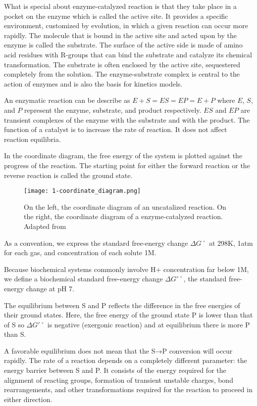 What is special about enzyme-catalyzed reaction is that they take place in a pocket on the enzyme
which is called the active site. It provides a specific environment, customized by evolution, in which
a given reaction can occur more rapidly. 
The molecule that is bound in the active site and acted upon by the enzyme is called the substrate.
The surface of the active side is made of amino acid residues with R-groups that can bind the 
substrate and catalyze its chemical transformation. The substrate is often enclosed by the active site, 
sequestered completely from the solution.
The enzyme-substrate complex is central to the action of enzymes and is also the basis for kinetics models.

An enzymatic reaction can be describe as $E+S=ES=EP=E+P$ where $E$, $S$, and $P$ represent the enzyme,
substrate, and product respectively. $ES$ and $EP$ are transient complexes of the enzyme with the substrate
and with the product. The function of a catalyst is to increase the rate of reaction. It does not affect
reaction equilibria. 

In the coordinate diagram, the free energy of the system is plotted against the progress of the reaction. 
The starting point for either the forward reaction or the reverse reaction is called the ground state.

\begin{figure}
  \centering
  \texttt{[image: 1-coordinate\_diagram.png]}
  \caption{On the left, the coordinate diagram of an uncatalized reaction. On the right, the coordinate diagram of a enzyme-catalyzed reaction. Adapted from \citeauthor{lehninger}}
  \label{fig:coordinate_diagram}
\end{figure}

As a convention, we express the standard free-energy change $\Delta G˚$ at 298K, 
1atm for each gas, and concentration of each solute 1M.

Because biochemical systems commonly involve H+ concentration far below 1M, we define 
a biochemical standard free-energy change $\Delta G'˚$, the standard free-energy 
change at pH 7.

The equilibrium between S and P reflects the difference in the free energies of their ground states. 
Here, the free energy of the ground state P is lower than that of S so $\Delta G'˚$ is 
negative (exergonic reaction) and at equilibrium there is more P than S.

A favorable equilibrium does not mean that the S→P conversion will occur rapidly. The rate of a 
reaction depends on a completely different parameter: the energy barrier between S and P. It consists 
of the energy required for the alignment of reacting groups, formation of transient unstable charges, 
bond rearrangements, and other transformations required for the reaction to proceed in either direction.

